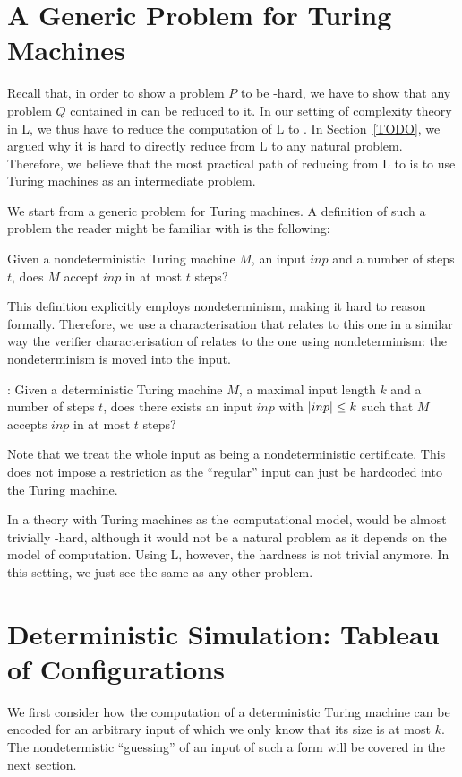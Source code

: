 \section{A Generic Problem for Turing Machines}
Recall that, in order to show a problem $P$ to be \NP{}-hard, we have to show that any problem $Q$ contained in \NP{} can be reduced to it. In our setting of complexity theory in L, we thus have to reduce the computation of L to \SAT{}.
In Section~\ref{TODO}, we argued why it is hard to directly reduce from L to any natural problem. 
Therefore, we believe that the most practical path of reducing from L to \SAT{} is to use Turing machines as an intermediate problem. 

We start from a generic problem for Turing machines. A definition of such a problem the reader might be familiar with is the following:
\begin{center}
  Given a nondeterministic Turing machine $M$, an input $inp$ and a number of steps $t$, does $M$ accept $inp$ in at most $t$ steps?
\end{center}
This definition explicitly employs nondeterminism, making it hard to reason formally. Therefore, we use a characterisation that relates to this one in a similar way the verifier characterisation of \NP{} relates to the one using nondeterminism: the nondeterminism is moved into the input.
\begin{center}
  \gennp{}:
  Given a deterministic Turing machine $M$, a maximal input length $k$ and a number of steps $t$, does there exists an input $inp$ with $|inp| \le k$ such that $M$ accepts $inp$ in at most $t$ steps?
\end{center}
Note that we treat the whole input as being a nondeterministic certificate. This does not impose a restriction as the ``regular'' input can just be hardcoded into the Turing machine.


In a theory with Turing machines as the computational model, \gennp{} would be almost trivially \NP{}-hard, although it would not be a natural problem as it depends on the model of computation.
Using L, however, the hardness is not trivial anymore. In this setting, we just see \gennp{} the same as any other problem.

\section{Deterministic Simulation: Tableau of Configurations}
We first consider how the computation of a deterministic Turing machine can be encoded for an arbitrary input of which we only know that its size is at most $k$. The nondetermistic ``guessing'' of an input of such a form will be covered in the next section.

